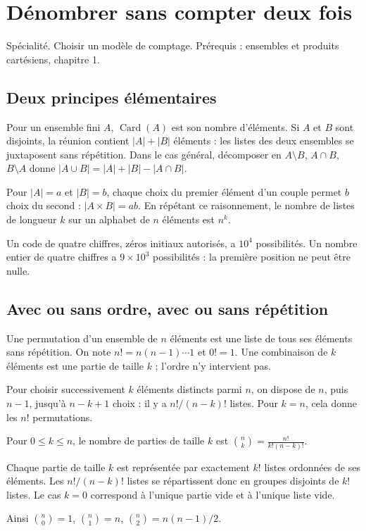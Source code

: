 \documentclass[../cours_tle.tex]{subfiles}
\begin{document}
\setcounter{chapter}{2}
\chapter{Dénombrer sans compter deux fois}
\label{ch:3}
\begin{objectif}
Spécialité. Choisir un modèle de comptage. Prérequis : ensembles et produits cartésiens, chapitre 1.
\end{objectif}
\section{Deux principes élémentaires}
Pour un ensemble fini $A$, $\operatorname{Card}(A)$ est son nombre d'éléments.
Si $A$ et $B$ sont disjoints, la réunion contient $|A|+|B|$ éléments : les listes des deux ensembles se juxtaposent sans répétition.
Dans le cas général, décomposer en $A\setminus B$, $A\cap B$, $B\setminus A$ donne
$|A\cup B|=|A|+|B|-|A\cap B|$.

Pour $|A|=a$ et $|B|=b$, chaque choix du premier élément d'un couple permet $b$ choix du second : $|A\times B|=ab$.
En répétant ce raisonnement, le nombre de listes de longueur $k$ sur un alphabet de $n$ éléments est $n^k$.
\begin{exemple}
Un code de quatre chiffres, zéros initiaux autorisés, a $10^4$ possibilités.
Un nombre entier de quatre chiffres a $9\times10^3$ possibilités : la première position ne peut être nulle.
\end{exemple}
\section{Avec ou sans ordre, avec ou sans répétition}
\begin{definition}
Une permutation d'un ensemble de $n$ éléments est une liste de tous ses éléments sans répétition. On note $n!=n(n-1)\cdots1$ et $0!=1$.
Une combinaison de $k$ éléments est une partie de taille $k$ ; l'ordre n'y intervient pas.
\end{definition}
Pour choisir successivement $k$ éléments distincts parmi $n$, on dispose de $n$, puis $n-1$, jusqu'à $n-k+1$ choix : il y a $n!/(n-k)!$ listes.
Pour $k=n$, cela donne les $n!$ permutations.

\begin{theoreme}
Pour $0\le k\le n$, le nombre de parties de taille $k$ est
$\displaystyle\binom nk=\frac{n!}{k!(n-k)!}$.
\end{theoreme}
\begin{demonstration}
Chaque partie de taille $k$ est représentée par exactement $k!$ listes ordonnées de ses éléments. Les $n!/(n-k)!$ listes se répartissent donc en groupes disjoints de $k!$ listes.
Le cas $k=0$ correspond à l'unique partie vide et à l'unique liste vide.
\end{demonstration}
Ainsi $\binom n0=1$, $\binom n1=n$, $\binom n2=n(n-1)/2$.
\end{document}
